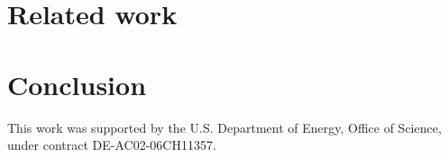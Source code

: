 \documentclass[sigconf,nonacm]{acmart}
\newcommand{\ryan}[1]{}
\newcommand{\ryan}[1]{{\textcolor{magenta}{ Ryan: #1 }}}
\begin{document}
\section{Related work}\label{sec:related}
\section{Conclusion}\label{sec:conclusion}

\begin{acks}
    This work was supported by the U.S. Department of Energy, Office of Science, under contract DE-AC02-06CH11357.
\end{acks}



\end{document}
